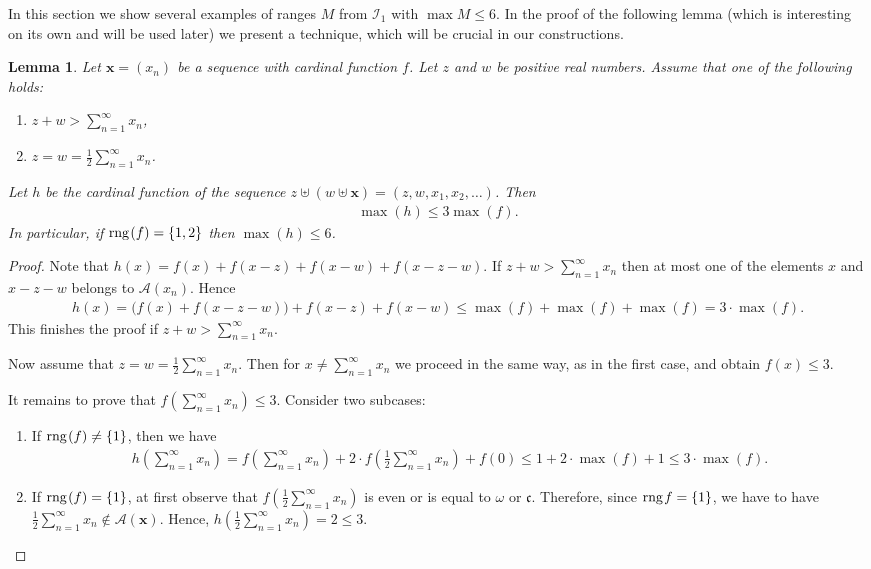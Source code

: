 \documentclass{amsart}
\newtheorem{lemma}[theorem]{Lemma}
\theoremstyle{definition}
\newcommand{\rng}{{\rm rng} \hspace{0.03cm}}
\begin{document}
In this section we show several examples of ranges $M$ from $\mathcal{I}_1$ with $\max M\leq 6$. In the proof of the following lemma (which is interesting on its own and will be used later) we present a technique, which will be crucial in our constructions.

\begin{lemma}\label{mniejnizszesc}
Let $\mathbf{x}=(x_n)$ be a sequence with cardinal function $f$. Let $z$ and $w$ be positive real numbers. Assume that one of the following holds:
\begin{enumerate}
\item $z+w>\sum_{n=1}^{\infty}x_n$,
\item $z=w= \frac{1}{2}\sum_{n=1}^{\infty}x_n$.
\end{enumerate}
Let $h$ be the cardinal function of the sequence $z\uplus (w\uplus \textbf{x}) = (z,w,x_{1},x_{2},\ldots )$. Then 
\begin{align*}
\max (h)\leq 3\max (f).
\end{align*}
In particular, if $\rng (f)=\{1,2\}$ then $\max (h)\leq 6$.
\end{lemma} 
\begin{proof}
Note that $h(x)=f(x)+f(x-z)+f(x-w)+f(x-z-w)$. If $z+w>\sum_{n=1}^{\infty}x_n$ then at most one of the elements $x$ and $x-z-w$ belongs to $\mathcal{A}(x_n)$. Hence  
\begin{align*}
h(x)=\big(f(x)+f(x-z-w)\big)+f(x-z)+f(x-w)\leq \max(f)+\max(f)+\max(f)=3\cdot\max(f).
\end{align*}
This finishes the proof if $z+w>\sum_{n=1}^{\infty}x_{n}$.

Now assume that $z=w=\frac{1}{2}\sum_{n=1}^{\infty}x_n$. Then for $x\neq \sum_{n=1}^{\infty}x_n$ we proceed in the same way, as in the first case, and obtain $f(x)\leq 3$. 

It remains to prove that $f\left(\sum_{n=1}^{\infty}x_n\right)\leq 3$. Consider two subcases:
\begin{enumerate}
	\item If $\rng (f)\neq\{1\}$, then we have
		\begin{align*}
		h\left(\sum_{n=1}^{\infty}x_n\right)=f\left(\sum_{n=1}^{\infty}x_n\right)+2\cdot f\left(\frac{1}{2}\sum_{n=1}^{\infty}x_n\right)+f(0)\leq 1+2\cdot \max(f) +1\leq 3\cdot \max(f).
		\end{align*}
	\item If $\rng (f)=\{1\}$, at first observe that $f\left(\frac{1}{2}\sum_{n=1}^{\infty}x_n\right)$ is even or is equal to $\omega$ or $\mathfrak{c}$. Therefore, since $\rng f=\{1\}$, we have to have $\frac{1}{2}\sum_{n=1}^{\infty}x_n\notin \mathcal{A}(\mathbf{x})$. Hence, $h\left(\frac{1}{2}\sum_{n=1}^{\infty}x_n\right) = 2\leq 3$.
\end{enumerate}
\end{proof}
\end{document}
